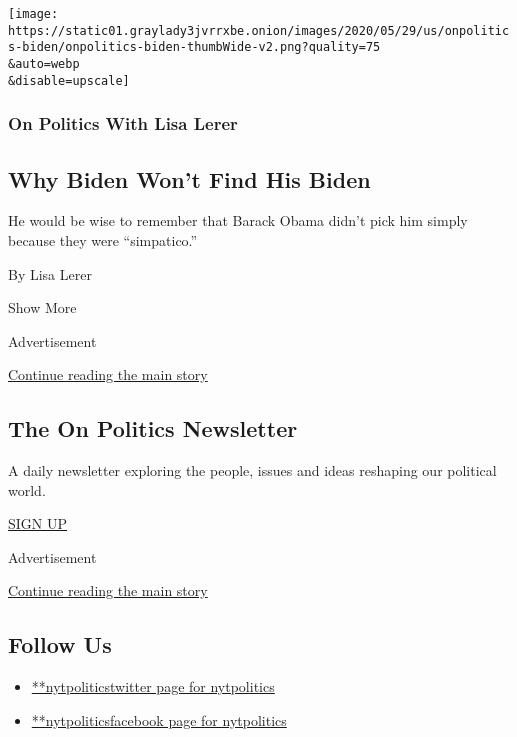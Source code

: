 \begin{enumerate}
  \texttt{[image: https://static01.graylady3jvrrxbe.onion/images/2020/05/29/us/onpolitics-biden/onpolitics-biden-thumbWide-v2.png?quality=75\\\&auto=webp\\\&disable=upscale]}

  \hypertarget{on-politics-with-lisa-lerer}{%
  \subsubsection{On Politics With Lisa
  Lerer}\label{on-politics-with-lisa-lerer}}

  \hypertarget{why-biden-wont-find-his-biden}{%
  \subsection{Why Biden Won't Find His
  Biden}\label{why-biden-wont-find-his-biden}}

  He would be wise to remember that Barack Obama didn't pick him simply
  because they were ``simpatico.''

  By Lisa Lerer
\end{enumerate}

Show More

Advertisement

\protect\hyperlink{after-mid2}{Continue reading the main story}

\hypertarget{the-on-politics-newsletter}{%
\subsection{The On Politics
Newsletter}\label{the-on-politics-newsletter}}

A daily newsletter exploring the people, issues and ideas reshaping our
political world.

\href{/newsletters/signup/CN}{SIGN UP}

Advertisement

\protect\hyperlink{after-mktg}{Continue reading the main story}

\hypertarget{follow-us}{%
\subsection{Follow Us}\label{follow-us}}

\begin{itemize}
\tightlist
\item
  \href{https://twitter.com/nytpolitics}{**nytpoliticstwitter page for
  nytpolitics}
\item
  \href{https://www.facebookcorewwwi.onion/nytpolitics}{**nytpoliticsfacebook
  page for nytpolitics}
\end{itemize}

